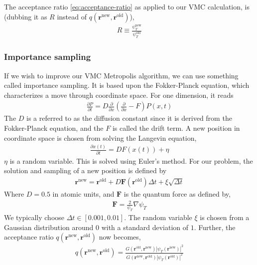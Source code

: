 \documentclass[11pt]{article}
\begin{document}
The acceptance ratio \eqref{eq:acceptance-ratio} as applied to our VMC calculation, is (dubbing it as $R$ instead of $q(\mathbf{r}^\text{new},\mathbf{r}^\text{old})$),
\begin{align}
	R \equiv \frac{\psi^\text{new}_T}{\psi^\text{old}_T}
	\label{eq:vmc-acceptance-ratio-uniform}
\end{align}

\subsubsection{Importance sampling}
If we wish to improve our VMC Metropolis algorithm, we can use something called importance sampling. It is based upon the Fokker-Planck equation, which characterizes a move through coordinate space. For one dimension, it reads
\begin{align}
	\frac{\partial P}{\partial t} = D \frac{\partial}{\partial x} \left( \frac{\partial}{\partial x} - F \right)P(x,t)
	\label{eq:fokker-planck}
\end{align}
The $D$ is a referred to as the diffusion constant since it is derived from the Fokker-Planck equation, and the $F$ is called the drift term. A new position in coordinate space is chosen from solving the Langevin equation,
\begin{align}
	\frac{\partial x(t)}{\partial t} = DF(x(t)) + \eta
	\label{eq:langevin}
\end{align}
$\eta$ is a random variable. This is solved using Euler's method. For our problem, the solution and sampling of a new position is defined by
\begin{align}
	\mathbf{r}^\text{new} = \mathbf{r}^\text{old} + D\mathbf{F}(\mathbf{r}^\text{old})\Delta t + \xi\sqrt{\Delta t}
	\label{eq:importance-sampling}
\end{align}
Where $D=0.5$ in atomic units, and $\mathbf{F}$ is the quantum force as defined by,
\begin{align}
	\mathbf{F} = \frac{2}{\psi_T}\nabla\psi_T
	\label{eq:quantum-force}
\end{align}
We typically choose $\Delta t\in [0.001,0.01]$. The random variable $\xi$ is chosen from a Gaussian distribution around $0$ with a standard deviation of $1$. Further, the acceptance ratio $q(\mathbf{r}^\text{new},\mathbf{r}^\text{old})$ now becomes,
\begin{align}
	q(\mathbf{r}^\text{new},\mathbf{r}^\text{old}) = \frac{G(\mathbf{r}^\text{old},\mathbf{r}^\text{new})|\psi_T(\mathbf{r}^\text{new})|^2}{G(\mathbf{r}^\text{new},\mathbf{r}^\text{old})|\psi_T(\mathbf{r}^\text{old})|^2}
	\label{eq:transition-probability-importance-sampling}
\end{align}
\end{document}
